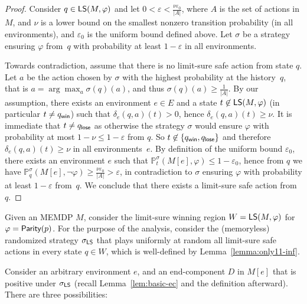 \documentclass[a4paper,USenglish,cleveref, autoref, thm-restate]{lipics-v2021}
\let\epsilon\varepsilon
\def\abs#1{\ensuremath{\lvert #1 \rvert}}
\newcommand*{\pr}{\mathbb{P}}
\newcommand\limitsure{\textrm{\sf LS}}
\newcommand\Parity{\textrm{\sf Parity}}
\def\loseabsorb{q_{\sf lose}}
\def\winabsorb{q_{\sf win}}
\begin{document}
\begin{proof}
	Consider $q \in \limitsure(M,\varphi)$ and let $0 < \epsilon < \frac{\nu \epsilon_0}{\abs{A}}$, 
	where $A$ is the set of actions in $M$, and $\nu$ is a lower bound on the smallest nonzero transition probability (in all environments),
	and $\epsilon_0$ is the uniform bound defined above.
	Let $\sigma$ be a strategy ensuring $\varphi$ from~$q$ with probability at least $1-\epsilon$ in all environments.
		
	Towards contradiction, assume that there is no limit-sure safe action from state $q$.
	Let $a$ be the action chosen by $\sigma$ with the highest probability at the history~$q$, that is $a = \arg\max_a \sigma(q)(a)$, and
	thus $\sigma(q)(a) \geq \frac{1}{\abs{A}}$.
	By our assumption, there exists an environment $e \in E$ and a state 
	$t \not \in \limitsure(M,\varphi)$ (in particular $t \neq \winabsorb$) such that 
	$\delta_e(q,a)(t) > 0$, hence $\delta_e(q,a)(t) \geq \nu$. It is immediate that $t \neq \loseabsorb$
	as otherwise the strategy $\sigma$ would ensure $\varphi$ with probability at most $1-\nu \leq 1-\epsilon$ from $q$.
	So $t \not\in \{\winabsorb,\loseabsorb\}$ and therefore $\delta_e(q,a)(t) \geq \nu$ in all environments~$e$.
	By definition of the uniform bound $\epsilon_0$, there exists an environment $e$ such that 
	$\pr_{t}^\sigma(M[e],\varphi) \leq 1-\epsilon_0$, 
	hence from $q$ we have $\pr_{q}^\sigma(M[e],\lnot \varphi) \geq \frac{\nu\epsilon_0}{\abs{A}} > \epsilon$,
	in contradiction to $\sigma$ ensuring $\varphi$ with probability at least $1-\epsilon$ from~$q$.
	We conclude that there exists a limit-sure safe action from $q$.
\end{proof}


Given an MEMDP $M$, consider the limit-sure winning region $W = \limitsure(M,\varphi)$ 
for $\varphi = \Parity(p)$.
For the purpose of the analysis, consider the (memoryless) randomized strategy $\sigma_{\limitsure}$ that plays uniformly at random 
all limit-sure safe actions in every state $q \in W$, 
which is well-defined by Lemma~\ref{lemma:only11-inf}. 

Consider an arbitrary environment $e$, and an end-component $D$ in $M[e]$ that is positive under $\sigma_{\limitsure}$
(recall Lemma~\ref{lem:basic-ec} and the definition afterward). There are three possibilities:
\end{document}
